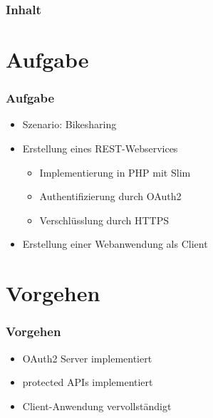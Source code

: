 \begin{frame}
	\frametitle*{Inhalt}
	\tableofcontents
\end{frame}

\section{Aufgabe}
\begin{frame}
	\frametitle*{Aufgabe}
	\begin{itemize}
		\item Szenario: Bikesharing
		\item Erstellung eines REST-Webservices
		\begin{itemize}
			\item Implementierung in PHP mit Slim
			\item Authentifizierung durch OAuth2
			\item Verschlüsslung durch HTTPS
		\end{itemize}
		\item Erstellung einer Webanwendung als Client
	\end{itemize}
\end{frame}

\section{Vorgehen}
\begin{frame}
	\frametitle*{Vorgehen}
	\begin{itemize}
		\item OAuth2 Server implementiert
		\item protected APIs implementiert
		\item Client-Anwendung vervollständigt
	\end{itemize}
\end{frame}

